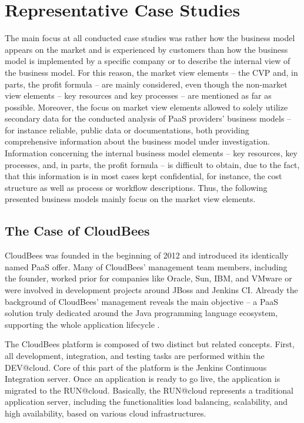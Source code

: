 \section{Representative Case Studies}

The main focus at all conducted case studies was rather how the business model appears on the market and is experienced by customers than how the business model is implemented by a specific company or to describe the internal view of the business model. For this reason, the market view elements -- the \ac{CVP} and, in parts, the profit formula -- are mainly considered, even though the non-market view elements -- key resources and key processes -- are mentioned as far as possible. Moreover, the focus on market view elements allowed to solely utilize secondary data for the conducted analysis of \ac{PaaS} providers' business models -- for instance reliable, public data or documentations, both providing comprehensive information about the business model under investigation. Information concerning the internal business model elements -- key resources, key processes, and, in parts, the profit formula -- is difficult to obtain, due to the fact, that this information is in most cases kept confidential, for instance, the cost structure as well as process or workflow descriptions. Thus, the following presented business models mainly focus on the market view elements.

\subsection{The Case of CloudBees}\label{ch:sota:cb}

CloudBees was founded in the beginning of 2012 and introduced its identically named \ac{PaaS} offer. Many of CloudBees' management team members, including the founder, worked prior for companies like Oracle, Sun, IBM, and VMware or were involved in development projects around JBoss and Jenkins CI. Already the background of CloudBees' management reveals the main objective -- a \ac{PaaS} solution truly dedicated around the Java programming language ecosystem, supporting the whole application lifecycle \citep{CloudBees2013}.

The CloudBees platform is composed of two distinct but related concepts. First, all development, integration, and testing tasks are performed within the DEV@cloud. Core of this part of the platform is the Jenkins Continuous Integration server. Once an application is ready to go live, the application is migrated to the RUN@cloud. Basically, the RUN@cloud represents a traditional application server, including the functionalities load balancing, scalability, and high availability, based on various cloud infrastructures.

